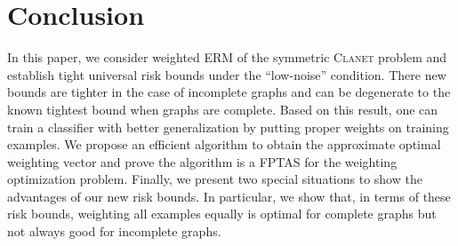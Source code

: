 \documentclass[letterpaper]{article} %
\newcommand{\probdistri}{\mathbf{p}}
\newcommand{\problemabbr}{\textnormal{C}\textsc{lanet}}
\newcommand{\normo}[1]{\|#1\|_1}
\begin{document}


\section{Conclusion} %
\label{sec:conclusion}
In this paper, we consider weighted ERM of the symmetric \problemabbr{} problem and establish tight universal risk bounds under the ``low-noise'' condition. 
There new bounds are tighter in the case of incomplete graphs and can be degenerate to the known tightest bound when graphs are complete. 
Based on this result, one can train a classifier with better generalization by putting proper weights on training examples. 
We propose an efficient algorithm to obtain the approximate optimal weighting vector and prove the algorithm is a FPTAS for the weighting optimization problem.
Finally, we present two special situations to show the advantages of our new risk bounds.
In particular, we show that, in terms of these risk bounds, weighting all examples equally is optimal for complete graphs but not always good for incomplete graphs. 


\newpage\newpage



\end{document}
